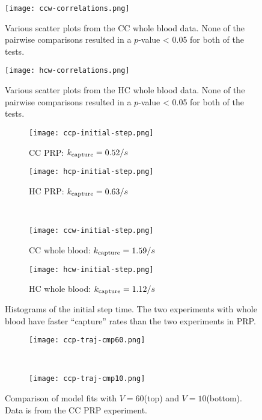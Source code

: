 \documentclass{article}
\newcommand{\tn}{\textnormal}
\begin{document}
\begin{figure}
  \centering
  \texttt{[image: ccw-correlations.png]}
  \caption{Various scatter plots from the CC whole blood data. None of
  the pairwise comparisons resulted in a $p$-value < 0.05 for both of
  the tests.}
  \label{fig:ccw-correlations}
\end{figure}

\begin{figure}
  \centering
  \texttt{[image: hcw-correlations.png]}
  \caption{Various scatter plots from the HC whole blood data. None of
  the pairwise comparisons resulted in a $p$-value < 0.05 for both of
  the tests.}
  \label{fig:hcw-correlations}
\end{figure}

\begin{figure}
  \centering
  \begin{subfigure}{0.48\textwidth}
    \texttt{[image: ccp-initial-step.png]}
    \caption{CC PRP: $k_\tn{capture} = 0.52 / s$}
  \end{subfigure}
  \hfill
  \begin{subfigure}{0.48\textwidth}
    \texttt{[image: hcp-initial-step.png]}
    \caption{HC PRP: $k_\tn{capture} = 0.63 / s$}
  \end{subfigure}
  \\
  \begin{subfigure}{0.48\textwidth}
    \texttt{[image: ccw-initial-step.png]}
    \caption{CC whole blood: $k_\tn{capture} = 1.59 / s$}
  \end{subfigure}
  \hfill
  \begin{subfigure}{0.48\textwidth}
    \texttt{[image: hcw-initial-step.png]}
    \caption{HC whole blood: $k_\tn{capture} = 1.12 / s$}
  \end{subfigure}
  \caption{Histograms of the initial step time. The two experiments
    with whole blood have faster ``capture'' rates than the two
    experiments in PRP.}
  \label{fig:initial-step}
\end{figure}

\begin{figure}
  \centering
  \begin{subfigure}{\textwidth}
    \texttt{[image: ccp-traj-cmp60.png]}
  \end{subfigure}
  \\
  \begin{subfigure}{\textwidth}
    \texttt{[image: ccp-traj-cmp10.png]}
  \end{subfigure}  
  \caption{Comparison of model fits with $V = 60$(top) and
    $V = 10$(bottom). Data is from the CC PRP experiment.}
  \label{fig:ccp-traj-cmp}
\end{figure}
\end{document}
